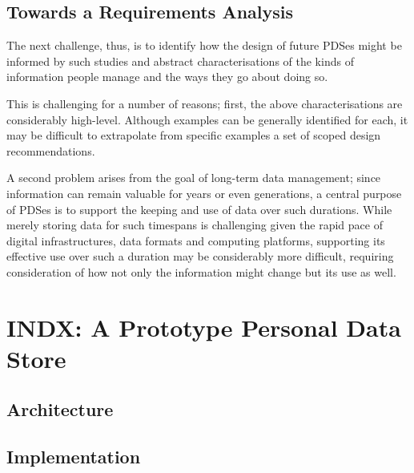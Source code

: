 \documentclass[runningheads,a4paper]{llncs}
\begin{document}



\subsection{Towards a Requirements Analysis}

The next challenge, thus, is to identify how the design of future PDSes might be informed by such studies and abstract characterisations of the kinds of information people manage and the ways they go about doing so.  

This is challenging for a number of reasons; first, the above characterisations are considerably high-level.  Although examples can be generally identified for each, it may be difficult to extrapolate from specific examples a set of scoped design recommendations.

A second problem arises from the goal of long-term data management; since information can remain valuable for years or even generations, a central purpose of PDSes is to support the keeping and use of data over such durations.  While merely storing data for such timespans is challenging given the rapid pace of digital infrastructures, data formats and computing platforms, supporting its effective use over such a duration may be considerably more difficult, requiring consideration of how not only the information might change but its use as well.

\section{INDX: A Prototype Personal Data Store}

\subsection{Architecture}

\subsection{Implementation}
\end{document}
